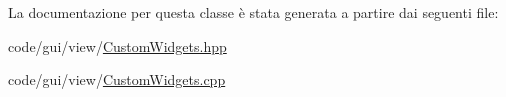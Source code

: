 La documentazione per questa classe è stata generata a partire dai seguenti file\+:\begin{DoxyCompactItemize}
\item 
code/gui/view/\mbox{\hyperlink{_custom_widgets_8hpp}{Custom\+Widgets.\+hpp}}\item 
code/gui/view/\mbox{\hyperlink{_custom_widgets_8cpp}{Custom\+Widgets.\+cpp}}\end{DoxyCompactItemize}
